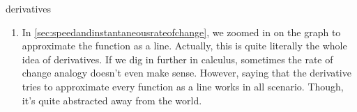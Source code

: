 \begin{remark}{}{derivatives}
    \begin{enumerate}
        \item In \cref{sec:speedandinstantaneousrateofchange}, we zoomed in on the graph to approximate the function as a line. Actually, this is quite literally the whole idea of derivatives. If we dig in further in calculus, sometimes the rate of change analogy doesn't even make sense. However, saying that the derivative tries to approximate every function as a line works in all scenario. Though, it's quite abstracted away from the world.
    \end{enumerate}
\end{remark}

